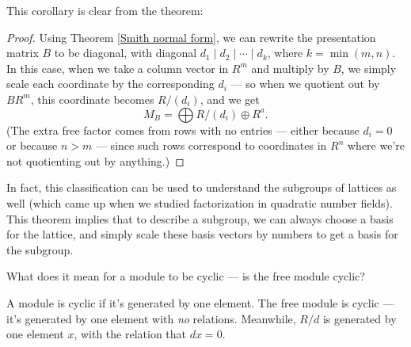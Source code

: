 This corollary is clear from the theorem:

\begin{proof}
Using Theorem \ref{Smith normal form}, we can rewrite the presentation matrix $B$ to be diagonal, with diagonal $d_1 \mid d_2 \mid \cdots \mid d_k$, where $k = \min(m, n)$. In this case, when we take a column vector in $R^m$ and multiply by $B$, we simply scale each coordinate by the corresponding $d_i$ --- so when we quotient out by $BR^m$, this coordinate becomes $R/(d_i)$, and we get \[M_B = \bigoplus R/(d_i) \oplus R^a.\] (The extra free factor comes from rows with no entries --- either because $d_i = 0$ or because $n > m$ --- since such rows correspond to coordinates in $R^n$ where we're not quotienting out by anything.)
\end{proof}




In fact, this classification can be used to understand the subgroups of lattices as well (which came up when we studied factorization in quadratic number fields). This theorem implies that to describe a subgroup, we can always choose a basis for the lattice, and simply scale these basis vectors by numbers to get a basis for the subgroup. 

\begin{question}
What does it mean for a module to be cyclic --- is the free module cyclic? 
\end{question}

\begin{ans}
A module is cyclic if it's generated by one element. The free module is cyclic --- it's generated by one element with \emph{no} relations. Meanwhile, $R/d$ is generated by one element $x$, with the relation that $dx = 0$. 
\end{ans}

